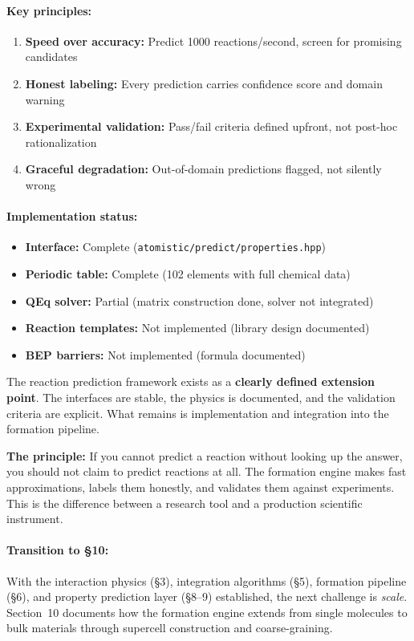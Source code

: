 \documentclass[11pt]{article}
\begin{document}
\paragraph{Key principles:}
\begin{enumerate}
\item \textbf{Speed over accuracy:} Predict 1000 reactions/second, screen for promising candidates
\item \textbf{Honest labeling:} Every prediction carries confidence score and domain warning
\item \textbf{Experimental validation:} Pass/fail criteria defined upfront, not post-hoc rationalization
\item \textbf{Graceful degradation:} Out-of-domain predictions flagged, not silently wrong
\end{enumerate}

\paragraph{Implementation status:}
\begin{itemize}
\item \textbf{Interface:} Complete (\texttt{atomistic/predict/properties.hpp})
\item \textbf{Periodic table:} Complete (102 elements with full chemical data)
\item \textbf{QEq solver:} Partial (matrix construction done, solver not integrated)
\item \textbf{Reaction templates:} Not implemented (library design documented)
\item \textbf{BEP barriers:} Not implemented (formula documented)
\end{itemize}

The reaction prediction framework exists as a \textbf{clearly defined extension point}. The interfaces are stable, the physics is documented, and the validation criteria are explicit. What remains is implementation and integration into the formation pipeline.

\textbf{The principle:} If you cannot predict a reaction without looking up the answer, you should not claim to predict reactions at all. The formation engine makes fast approximations, labels them honestly, and validates them against experiments. This is the difference between a research tool and a production scientific instrument.

\paragraph{Transition to \S10:} With the interaction physics (\S3), integration algorithms (\S5), formation pipeline (\S6), and property prediction layer (\S8--9) established, the next challenge is \textit{scale}. Section~10 documents how the formation engine extends from single molecules to bulk materials through supercell construction and coarse-graining.
\end{document}
